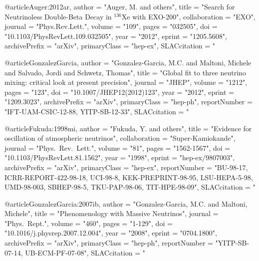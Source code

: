 {{@article{Auger:2012ar,
      author         = "Auger, M. and others",
      title          = "{Search for Neutrinoless Double-Beta Decay in $^{136}$Xe
                        with EXO-200}",
      collaboration  = "EXO",
      journal        = "Phys.Rev.Lett.",
      volume         = "109",
      pages          = "032505",
      doi            = "10.1103/PhysRevLett.109.032505",
      year           = "2012",
      eprint         = "1205.5608",
      archivePrefix  = "arXiv",
      primaryClass   = "hep-ex",
      SLACcitation   = "%
}

@article{GonzalezGarcia,
      author         = "Gonzalez-Garcia, M.C. and Maltoni, Michele and Salvado,
                        Jordi and Schwetz, Thomas",
      title          = "{Global fit to three neutrino mixing: critical look at
                        present precision}",
      journal        = "JHEP",
      volume         = "1212",
      pages          = "123",
      doi            = "10.1007/JHEP12(2012)123",
      year           = "2012",
      eprint         = "1209.3023",
      archivePrefix  = "arXiv",
      primaryClass   = "hep-ph",
      reportNumber   = "IFT-UAM-CSIC-12-88, YITP-SB-12-33",
      SLACcitation   = "%
}

@article{Fukuda:1998mi,
      author         = "Fukuda, Y. and others",
      title          = "{Evidence for oscillation of atmospheric neutrinos}",
      collaboration  = "Super-Kamiokande",
      journal        = "Phys.\ Rev.\ Lett.",
      volume         = "81",
      pages          = "1562-1567",
      doi            = "10.1103/PhysRevLett.81.1562",
      year           = "1998",
      eprint         = "hep-ex/9807003",
      archivePrefix  = "arXiv",
      primaryClass   = "hep-ex",
      reportNumber   = "BU-98-17, ICRR-REPORT-422-98-18, UCI-98-8,
                        KEK-PREPRINT-98-95, LSU-HEPA-5-98, UMD-98-003, SBHEP-98-5,
                        TKU-PAP-98-06, TIT-HPE-98-09",
      SLACcitation   = "%
}

@article{GonzalezGarcia:2007ib,
      author         = "Gonzalez-Garcia, M.C. and Maltoni, Michele",
      title          = "{Phenomenology with Massive Neutrinos}",
      journal        = "Phys.\ Rept.",
      volume         = "460",
      pages          = "1-129",
      doi            = "10.1016/j.physrep.2007.12.004",
      year           = "2008",
      eprint         = "0704.1800",
      archivePrefix  = "arXiv",
      primaryClass   = "hep-ph",
      reportNumber   = "YITP-SB-07-14, UB-ECM-PF-07-08",
      SLACcitation   = "%
}

}}
